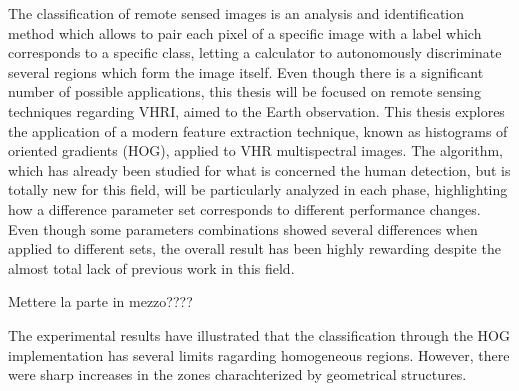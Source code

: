 
\english
\sommario

The classification of remote sensed images is an analysis and identification method which allows to pair each pixel of a specific image with a label which corresponds to a specific class, letting a calculator to autonomously discriminate several regions which form the image itself.
Even though there is a significant number of possible applications, this thesis will be focused on remote sensing techniques regarding VHRI, aimed to the Earth observation. 
This thesis explores the application of a modern feature extraction technique, known as histograms of oriented gradients (HOG), applied to VHR multispectral images. 
The algorithm, which has already been studied for what is concerned the human detection, but is totally new for this field, will be particularly analyzed in each phase, highlighting how a difference parameter set corresponds to different performance changes. 
Even though some parameters combinations showed several differences when applied to different sets, the overall result has been highly rewarding despite  the almost total lack of previous work in this field.    

Mettere la parte in mezzo????

The experimental results have illustrated that the classification through the HOG implementation has several limits ragarding homogeneous regions. However, there were sharp increases in the zones charachterized by geometrical structures. 